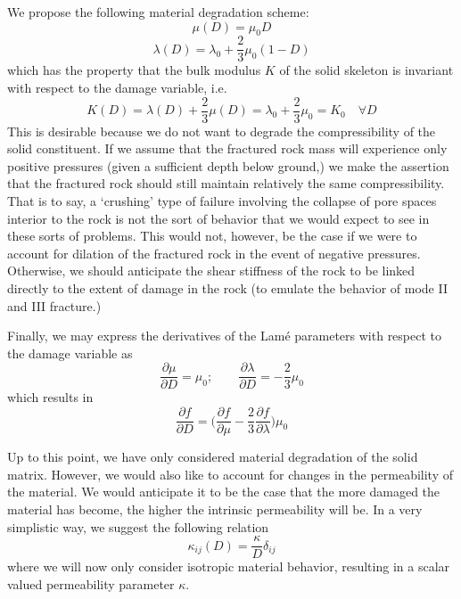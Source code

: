 \documentclass[11pt]{article} %
\begin{document}
We propose the following material degradation scheme:
\begin{equation}
	\mu (D) = \mu_0 D
\end{equation}
\begin{equation}
	\lambda (D) = \lambda_0 + \frac{2}{3} \mu_0 (1 - D)
\end{equation}
which has the property that the bulk modulus $K$ of the solid skeleton is invariant with respect to the damage variable, i.e.
\begin{equation}
	K(D) = \lambda (D) + \frac{2}{3} \mu (D) = \lambda_0 + \frac{2}{3} \mu_0 = K_0 \quad \forall D
\end{equation}
This is desirable because we do not want to degrade the compressibility of the solid constituent. If we assume that the fractured rock mass will experience only positive pressures (given a sufficient depth below ground,) we make the assertion that the fractured rock should still maintain relatively the same compressibility. That is to say, a `crushing' type of failure involving the collapse of pore spaces interior to the rock is not the sort of behavior that we would expect to see in these sorts of problems. This would not, however, be the case if we were to account for dilation of the fractured rock in the event of negative pressures. Otherwise, we should anticipate the shear stiffness of the rock to be linked directly to the extent of damage in the rock (to emulate the behavior of mode II and III fracture.)

Finally, we may express the derivatives of the Lam\'{e} parameters with respect to the damage variable as
\begin{equation}
	\frac{\partial \mu}{\partial D} = \mu_0; \qquad \frac{\partial \lambda}{\partial D} = -\frac{2}{3} \mu_0
\end{equation}
which results in
\begin{equation}
	\frac{\partial f}{\partial D} = \bigg( \frac{\partial f}{\partial \mu} - \frac{2}{3} \frac{\partial f}{\partial \lambda} \bigg) \mu_0
\end{equation}

Up to this point, we have only considered material degradation of the solid matrix. However, we would also like to account for changes in the permeability of the material. We would anticipate it to be the case that the more damaged the material has become, the higher the intrinsic permeability will be. In a very simplistic way, we suggest the following relation
\begin{equation}
	\kappa_{ij} (D) = \frac{\kappa}{D} \delta_{ij}
\end{equation}
where we will now only consider isotropic material behavior, resulting in a scalar valued permeability parameter $\kappa$.
\end{document}
